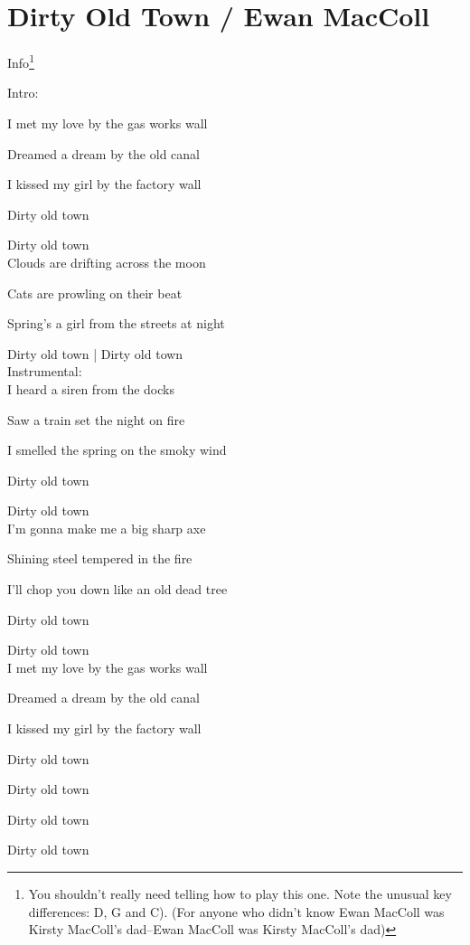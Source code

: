 \section{Dirty Old Town / Ewan MacColl}\label{sec:dirty_old_town}
Info\footnote{You shouldn’t really need telling how to play this one. Note the unusual key differences: D, G and C). (For anyone who didn’t know Ewan MacColl was Kirsty MacColl's dad--Ewan MacColl was Kirsty MacColl's dad)}
\Cmajor
\Dmajor
\Fmajor
\Gmajor
\Aminor
\Bminor
\EminorSeven

Intro:\hrulefill{}\hrulefill{}\hrulefill{}\hrulefill

I met my love by the gas works wall 

Dreamed a dream by the old canal 

I kissed my girl by the factory wall

Dirty old town

Dirty old town\\


Clouds are drifting across the moon 

Cats are prowling on their beat 

Spring's a girl from the streets at night 

Dirty old town | Dirty old town\\


Instrumental: \hrulefill{}\hrulefill{}\hrulefill{}\hrulefill{}\hrulefill\\


I heard a siren from the docks

Saw a train set the night on fire 

I smelled the spring on the smoky wind 

Dirty old town

Dirty old town\\


I'm gonna make me a big sharp axe 

Shining steel tempered in the fire 

I'll chop you down like an old dead tree 

Dirty old town

Dirty old town\\


I met my love by the gas works wall 

Dreamed a dream by the old canal

I kissed my girl by the factory wall

Dirty old town

Dirty old town

Dirty old town

Dirty old town